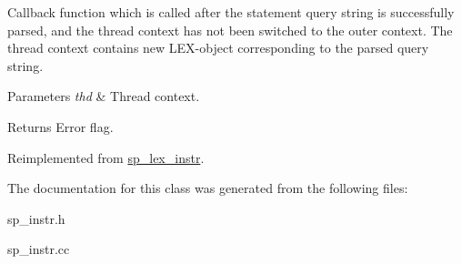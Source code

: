 Callback function which is called after the statement query string is successfully parsed, and the thread context has not been switched to the outer context. The thread context contains new L\+EX-\/object corresponding to the parsed query string.


\begin{DoxyParams}{Parameters}
{\em thd} & Thread context.\\
\hline
\end{DoxyParams}
\begin{DoxyReturn}{Returns}
Error flag. 
\end{DoxyReturn}


Reimplemented from \mbox{\hyperlink{classsp__lex__instr_adcace7d5b7daeb393d0592592a2d9d6c}{sp\+\_\+lex\+\_\+instr}}.



The documentation for this class was generated from the following files\+:\begin{DoxyCompactItemize}
\item 
sp\+\_\+instr.\+h\item 
sp\+\_\+instr.\+cc\end{DoxyCompactItemize}
